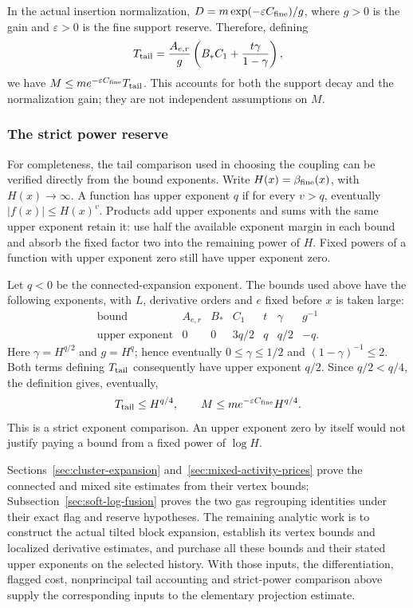In the actual insertion normalization,
$D=m\exp(-\varepsilon C_{\rm fine})/g$, where $g>0$ is the gain and
$\varepsilon>0$ is the fine support reserve. Therefore, defining
\[
 T_{\rm tail}=\frac{A_{e,r}}g
                   \left(B_*C_1+\frac{t\gamma}{1-\gamma}\right),
\]
we have $M\le m e^{-\varepsilon C_{\rm fine}}T_{\rm tail}$.
This accounts for both the support decay and the normalization gain;
they are not independent assumptions on $M$.

\subsubsection{The strict power reserve}
For completeness, the tail comparison used in choosing the coupling
can be verified directly from the bound exponents. Write
$H(x)=\beta_{\rm fine}(x)$, with $H(x)\to\infty$. A function has
upper exponent $q$ if for every $v>q$, eventually
$|f(x)|\le H(x)^v$. Products add upper exponents and sums with the
same upper exponent retain it: use half the available exponent margin
in each bound and absorb the fixed factor two into the remaining
power of $H$. Fixed powers of a function with upper exponent zero
still have upper exponent zero.

Let $q<0$ be the connected-expansion exponent. The bounds used above
have the following exponents, with $L$, derivative orders and $e$
fixed before $x$ is taken large:
\[
\begin{array}{c|cccccc}
\text{bound}&A_{e,r}&B_*&C_1&t&\gamma&g^{-1}\\ \hline
\text{upper exponent}&0&0&3q/2&q&q/2&-q.
\end{array}
\]
Here $\gamma=H^{q/2}$ and $g=H^q$; hence eventually
$0\le\gamma\le1/2$ and $(1-\gamma)^{-1}\le2$. Both terms defining
$T_{\rm tail}$ consequently have upper exponent $q/2$.
Since $q/2<q/4$, the definition gives, eventually,
\begin{equation}\label{eq:leaf-tail-power}
                 T_{\rm tail}\le H^{q/4},\qquad
          M\le m e^{-\varepsilon C_{\rm fine}}H^{q/4}.
\end{equation}
This is a strict exponent comparison. An upper exponent zero by itself
would not justify paying a bound from a fixed power of $\log H$.

Sections~\ref{sec:cluster-expansion} and~\ref{sec:mixed-activity-prices}
prove the connected and mixed site estimates from their vertex bounds;
Subsection~\ref{sec:soft-log-fusion} proves the two gas regrouping identities
under their exact flag and reserve hypotheses. The remaining analytic
work is to construct the actual tilted block expansion, establish its
vertex bounds and localized derivative estimates, and purchase all
these bounds and their stated upper exponents on the selected history.
With those inputs, the differentiation, flagged cost, nonprincipal
tail accounting and strict-power comparison above supply the
corresponding inputs to the elementary projection estimate.
